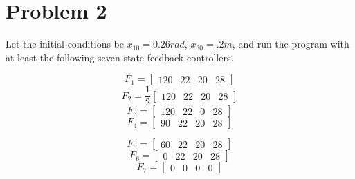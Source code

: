 \documentclass{article}
\begin{document}
\section*{Problem 2}
Let the initial conditions be $x_{10} = 0.26rad$, $x_{30} = .2m$, and run the program with at least the following seven state feedback controllers.
\newline
\begin{minipage}{0.45\textwidth}
$$ F_1 = \begin{bmatrix} 120 & 22 & 20 & 28 \end{bmatrix} $$
$$ F_2 = \frac{1}{2}\begin{bmatrix} 120 & 22 & 20 & 28 \end{bmatrix} $$
$$ F_3 = \begin{bmatrix} 120 & 22 & 0 & 28 \end{bmatrix} $$
$$ F_4 = \begin{bmatrix} 90 & 22 & 20 & 28 \end{bmatrix} $$
\end{minipage}
\begin{minipage}{0.45\textwidth}
$$ F_5 = \begin{bmatrix} 60 & 22 & 20 & 28 \end{bmatrix} $$
$$ F_6 = \begin{bmatrix} 0 & 22 & 20 & 28 \end{bmatrix} $$
$$ F_7 = \begin{bmatrix} 0 & 0 & 0 & 0 \end{bmatrix} $$
\end{minipage}
\newline
\newline
\end{document}
